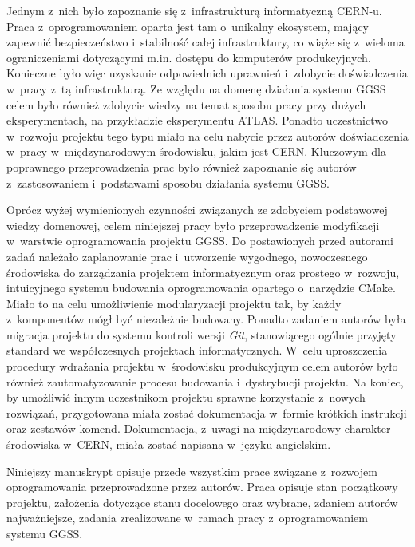 Jednym z~nich było zapoznanie się z~infrastrukturą informatyczną CERN-u. Praca z~oprogramowaniem oparta jest tam o~unikalny ekosystem, mający zapewnić bezpieczeństwo i~stabilność całej infrastruktury, co wiąże się z~wieloma ograniczeniami dotyczącymi m.in. dostępu do komputerów produkcyjnych. Konieczne było więc uzyskanie odpowiednich uprawnień i~zdobycie doświadczenia w~pracy z~tą infrastrukturą. Ze względu na domenę działania systemu GGSS celem było również zdobycie wiedzy na temat sposobu pracy przy dużych eksperymentach, na przykładzie eksperymentu ATLAS. Ponadto uczestnictwo w~rozwoju projektu tego typu miało na celu nabycie przez autorów doświadczenia w~pracy w~międzynarodowym środowisku, jakim jest CERN. Kluczowym dla poprawnego przeprowadzenia prac było również zapoznanie się autorów z~zastosowaniem i~podstawami sposobu działania systemu GGSS. \par

Oprócz wyżej wymienionych czynności związanych ze zdobyciem podstawowej wiedzy domenowej, celem niniejszej pracy było przeprowadzenie modyfikacji w~warstwie oprogramowania projektu GGSS. Do postawionych przed autorami zadań należało zaplanowanie prac i~utworzenie wygodnego, nowoczesnego środowiska do zarządzania projektem informatycznym oraz prostego w~rozwoju, intuicyjnego systemu budowania oprogramowania opartego o~narzędzie CMake. Miało to na celu umożliwienie modularyzacji projektu tak, by każdy z~komponentów mógł być niezależnie budowany. Ponadto zadaniem autorów była migracja projektu do systemu kontroli wersji \textit{Git}, stanowiącego ogólnie przyjęty standard we współczesnych projektach informatycznych. W~celu uproszczenia procedury wdrażania projektu w~środowisku produkcyjnym celem autorów było również zautomatyzowanie procesu budowania i~dystrybucji projektu. Na koniec, by umożliwić innym uczestnikom projektu sprawne korzystanie z~nowych rozwiązań, przygotowana miała zostać dokumentacja w~formie krótkich instrukcji oraz zestawów komend. Dokumentacja, z~uwagi na międzynarodowy charakter środowiska w~CERN, miała zostać napisana w~języku angielskim. \par

Niniejszy manuskrypt opisuje przede wszystkim prace związane z~rozwojem oprogramowania przeprowadzone przez autorów. Praca opisuje stan początkowy projektu, założenia dotyczące stanu docelowego oraz wybrane, zdaniem autorów najważniejsze, zadania zrealizowane w~ramach pracy z~oprogramowaniem systemu GGSS.